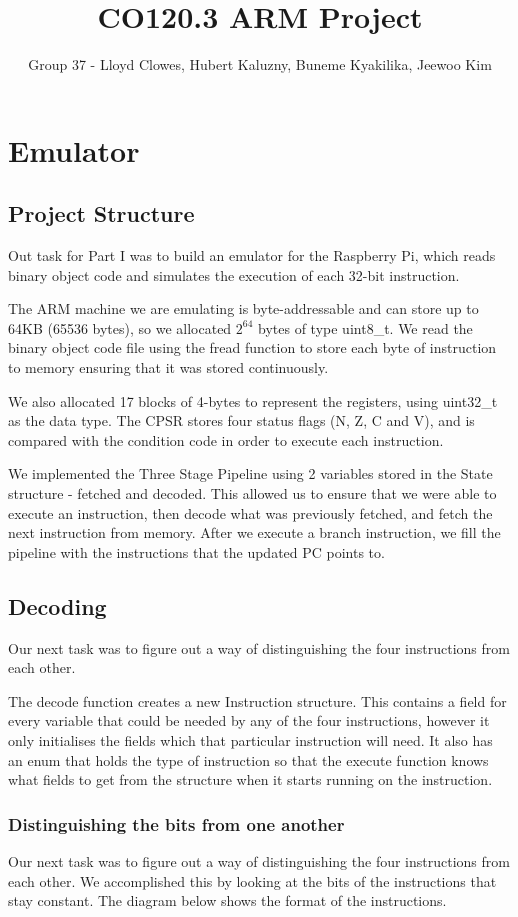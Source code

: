 \documentclass[a4paper]{article}
\title{CO120.3 ARM Project}
\author{Group 37 - Lloyd Clowes, Hubert Kaluzny, Buneme Kyakilika, Jeewoo Kim}
\begin{document}
\maketitle
\section{Emulator}
\subsection{Project Structure}
Out task for Part I was to build an emulator for the Raspberry Pi, which reads binary object code and simulates the execution of each 32-bit instruction.

The ARM machine we are emulating is byte-addressable and can store up to 64KB (65536 bytes), so we allocated $2^{64}$ bytes of type uint8\_t. We read the binary object code file using the fread function to store each byte of instruction to memory ensuring that it was stored continuously.

We also allocated 17 blocks of 4-bytes to represent the registers, using uint32\_t as the data type. The CPSR stores four status flags (N, Z, C and V), and is compared with the condition code in order to execute each instruction.

We implemented the Three Stage Pipeline using 2 variables stored in the State structure - fetched and decoded. This allowed us to ensure that we were able to execute an instruction, then decode what was previously fetched, and fetch the next instruction from memory. After we execute a branch instruction, we fill the pipeline with the instructions that the updated PC points to.
\subsection{Decoding}
Our next task was to figure out a way of distinguishing the four instructions from each other.

The decode function creates a new Instruction structure. This contains a field for every variable that could be needed by any of the four instructions, however it only initialises the fields which that particular instruction will need. It also has an enum that holds the type of instruction so that the execute function knows what fields to get from the structure when it starts running on the instruction.

\subsubsection{Distinguishing the bits from one another}
Our next task was to figure out a way of distinguishing the four instructions from each other. We accomplished this by looking at the bits of the instructions that stay constant. The diagram below shows the format of the instructions.
\end{document}
